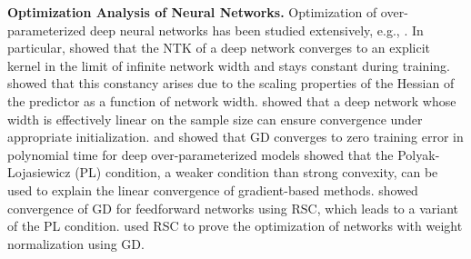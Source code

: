 {\bf Optimization Analysis of Neural Networks.}
Optimization of over-parameterized deep neural networks has been studied extensively, e.g., \citep{du2019gradient,Arora_Du_Neurips_2019,arora2019fine,allen-zhu_convergence_2019,liu_linearity_2021}. In particular, \citet{jacot2018neural} showed that the %
NTK of a deep network converges to an explicit kernel in the limit of infinite network width and stays constant during training. \citet{liu_linearity_2021} showed that this constancy arises due to the scaling properties of the Hessian of the predictor as a function of network width. 
\citet{banerjee23a} showed that a deep network whose width is effectively linear on the sample size can ensure convergence under appropriate initialization.
\citet{du2019gradient} and \citet{allen-zhu_convergence_2019} showed that GD converges to zero training error in polynomial time for deep over-parameterized models 
%
%
\citet{karimi2016linear} showed that the Polyak-Lojasiewicz (PL) condition, a 
weaker condition than strong convexity, can be used to explain the linear convergence of gradient-based methods. \citet{banerjee2022restricted} showed convergence of GD for feedforward networks using 
RSC, 
which leads to a variant of the PL condition. \citet{cisnerosvelarde2024optgenWeightNorm} used RSC to prove the optimization of networks with weight normalization using GD.